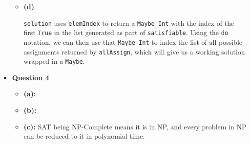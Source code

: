 \documentclass[12pt]{article}
\begin{document}
\begin{itemize}
\begin{itemize}
      \item \textbf{(d)}
        
        \verb|solution| uses \verb|elemIndex| to return a \verb|Maybe Int| with the index of the first \verb|True| in the list
        generated as part of \verb|satisfiable|. Using the \verb|do| notation, we can then use that \verb|Maybe Int| to index the list of
        all possible assignments returned by \verb|allAssign|, which will give us a working solution wrapped in a \verb|Maybe|.
    \end{itemize}

    \pagebreak
  \item \textbf{Question 4}
    \begin{itemize}
      \item \textbf{(a):}\\
      \item \textbf{(b):}
      \item \textbf{(c):} SAT being NP-Complete means it is in NP, and every problem in NP can be reduced to it in
        polynomial time.
    \end{itemize}
\end{itemize}
\end{document}
